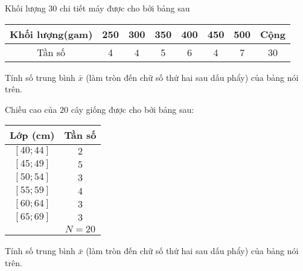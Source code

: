 \begin{vd}%
Khối lượng $30$ chi tiết máy được cho bởi bảng sau
\begin{center}
\begin{tabular}{|c|c|c|c|c|c|c|c|}
\hline
Khối lượng(gam)  & 250 &300&350& 400 &450 &500& Cộng   \\
\hline
Tần số&4&4 & 5& 6 &4 &7& 30  \\
\hline	
\end{tabular}
\end{center}
Tính số trung bình $\bar{x}$ (làm tròn đến chữ số thứ hai sau dấu phẩy) của bảng nói trên.
\end{vd}
\begin{vd}%
Chiều cao của $20$ cây giống  được cho bởi bảng sau:
	\begin{center}
		\begin{tabular}{|c|c|}
			\hline  
			{\bf Lớp} (cm)&{\bf Tần số}\\
			\hline 
			$[40;44]$ & $2$ \\
			$[45;49]$ & $5$ \\
			$[50;54]$ & $3$ \\
			$[55;59]$ & $4$ \\
			$[60;64]$ & $3$ \\
			$[65;69]$ & $3$ \\
			\hline
			& $N=20$ \\
			\hline
		\end{tabular} 
	\end{center}
Tính số trung bình $\bar{x}$ (làm tròn đến chữ số thứ hai sau dấu phẩy) của bảng nói trên.
\end{vd}
